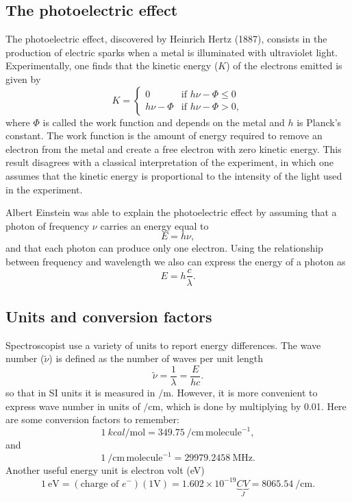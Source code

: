\subsection{The photoelectric effect}
The photoelectric effect, discovered by Heinrich Hertz (1887), consists in the production of electric sparks when a metal is illuminated with ultraviolet light.
Experimentally, one finds that the kinetic energy ($K$) of the electrons emitted is given by
\begin{equation}
K = \begin{cases}
0 & \text{if } h\nu - \Phi  \leq 0 \\
h\nu - \Phi & \text{if } h\nu - \Phi  > 0,
\end{cases}
\end{equation}
where $\Phi$ is called the work function and depends on the metal and $h$ is Planck's constant.
The work function is the amount of energy required to remove an electron from the metal and create a free electron with zero kinetic energy.
This result disagrees with a classical interpretation of the experiment, in which one assumes that the kinetic energy is proportional to the intensity of the light used in the experiment.

Albert Einstein was able to explain the photoelectric effect by assuming that a photon of frequency $\nu$ carries an energy equal to
\begin{equation}
E = h \nu,
\end{equation}
and that each photon can produce only one electron.
Using the relationship between frequency and wavelength we also can express the energy of a photon as
\begin{equation}
E = h \frac{c}{\lambda}.
\end{equation}

\subsection{Units and conversion factors}
Spectroscopist use a variety of units to report energy differences.
The wave number ($\tilde{\nu}$) is defined as the number of waves per unit length
\begin{equation}
\tilde{\nu} = \frac{1}{\lambda} = \frac{E}{hc}.
\end{equation}
so that in SI units it is measured in $\si{\per\meter}$. However, it is more convenient to express wave number in units of $\si{\per\centi\meter}$, which is done by multiplying by 0.01.
Here are some conversion factors to remember:
\begin{equation}
\SI{1}{kcal\per\mole} = \SI{349.75}{\per\centi\meter}\,\mathrm{molecule}^{-1},
\end{equation}
and 
\begin{equation}
\SI{1}{\per\centi\meter}\,\mathrm{molecule}^{-1} = \SI{29979.2458}{\mega\hertz}.
\end{equation}
Another useful energy unit is electron volt (eV)
\begin{equation}
\SI{1}{\electronvolt} = (\text{charge of }e^{-})(1\si{\volt})  =  1.602\times10^{-19} \underbrace{C V}_{J} 
=\SI{8065.54}{\per\centi\meter}.
\end{equation}

